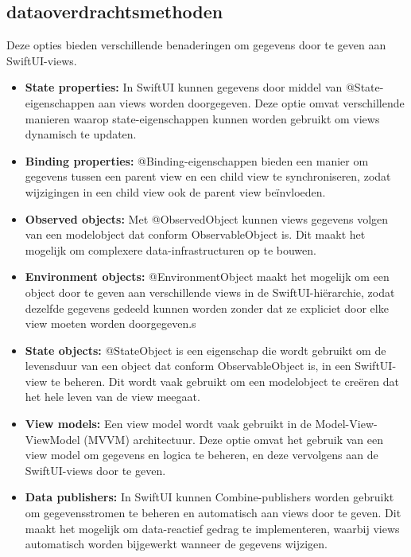 \subsection{dataoverdrachtsmethoden}
Deze opties bieden verschillende benaderingen om gegevens door te geven aan SwiftUI-views.
\begin{itemize}
    \item {\textbf{State properties:} In SwiftUI kunnen gegevens door middel van @State-eigenschappen aan views worden doorgegeven. Deze optie omvat verschillende manieren waarop state-eigenschappen kunnen worden gebruikt om views dynamisch te updaten.}
    \item {\textbf{Binding properties:} @Binding-eigenschappen bieden een manier om gegevens tussen een parent view en een child view te synchroniseren, zodat wijzigingen in een child view ook de parent view beïnvloeden.}
    \item {\textbf{Observed objects:} Met @ObservedObject kunnen views gegevens volgen van een modelobject dat conform ObservableObject is. Dit maakt het mogelijk om complexere data-infrastructuren op te bouwen.}
    \item {\textbf{Environment objects:} @EnvironmentObject maakt het mogelijk om een object door te geven aan verschillende views in de SwiftUI-hiërarchie, zodat dezelfde gegevens gedeeld kunnen worden zonder dat ze expliciet door elke view moeten worden doorgegeven.}s
    \item {\textbf{State objects:} @StateObject is een eigenschap die wordt gebruikt om de levensduur van een object dat conform ObservableObject is, in een SwiftUI-view te beheren. Dit wordt vaak gebruikt om een modelobject te creëren dat het hele leven van de view meegaat.}
    \item {\textbf{View models:} Een view model wordt vaak gebruikt in de Model-View-ViewModel (MVVM) architectuur. Deze optie omvat het gebruik van een view model om gegevens en logica te beheren, en deze vervolgens aan de SwiftUI-views door te geven.}
    \item {\textbf{Data publishers:} In SwiftUI kunnen Combine-publishers worden gebruikt om gegevensstromen te beheren en automatisch aan views door te geven. Dit maakt het mogelijk om data-reactief gedrag te implementeren, waarbij views automatisch worden bijgewerkt wanneer de gegevens wijzigen.}
\end{itemize}
